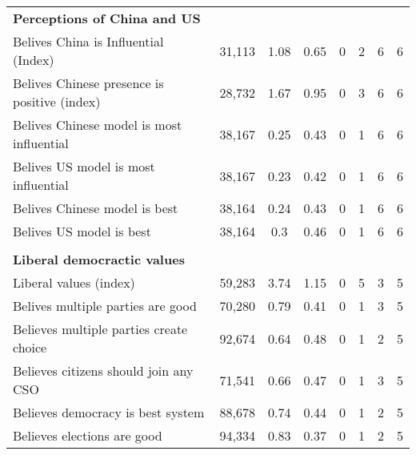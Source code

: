 \begin{tabular}{l ccccccc}
  \multicolumn{8}{l}{\bf Perceptions of China and US} \\ 
 Belives China is Influential (Index)  &  31,113  &  1.08  &  0.65  &  0  &  2  &  6  &  6  \\ Belives Chinese presence is positive (index)  &  28,732  &  1.67  &  0.95  &  0  &  3  &  6  &  6  \\ Belives Chinese model is most influential  &  38,167  &  0.25  &  0.43  &  0  &  1  &  6  &  6  \\ Belives US model is most influential  &  38,167  &  0.23  &  0.42  &  0  &  1  &  6  &  6  \\ Belives Chinese model is best  &  38,164  &  0.24  &  0.43  &  0  &  1  &  6  &  6  \\ Belives US model is best  &  38,164  &  0.3  &  0.46  &  0  &  1  &  6  &  6  \\  & & & & & & & \\ 
  \multicolumn{8}{l}{\bf Liberal democractic values} \\ 
 Liberal values (index)  &  59,283  &  3.74  &  1.15  &  0  &  5  &  3  &  5  \\ Belives multiple parties are good  &  70,280  &  0.79  &  0.41  &  0  &  1  &  3  &  5  \\ Believes multiple parties create choice  &  92,674  &  0.64  &  0.48  &  0  &  1  &  2  &  5  \\ Believes citizens should join any CSO  &  71,541  &  0.66  &  0.47  &  0  &  1  &  3  &  5  \\ Believes democracy is best system  &  88,678  &  0.74  &  0.44  &  0  &  1  &  2  &  5  \\ Believes elections are good  &  94,334  &  0.83  &  0.37  &  0  &  1  &  2  &  5  \\ \hline  \end{tabular}